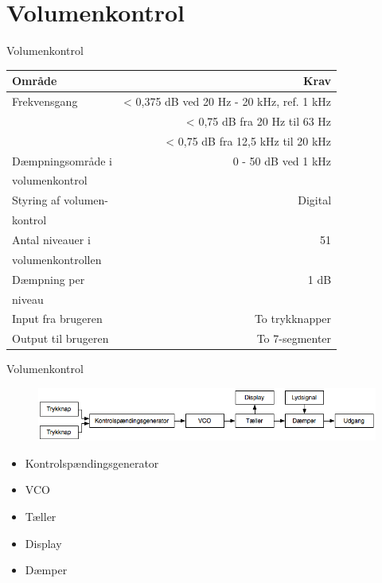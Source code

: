 \section{Volumenkontrol}

\begin{frame}{Volumenkontrol}
\scriptsize{
\begin{table}[h]
\centering
\begin{tabular}{l|r}
\hline\hline
Område & Krav \\
\hline\hline
Frekvensgang & < 0,375 dB ved 20 Hz - 20 kHz, ref. 1 kHz \\
& < 0,75 dB fra 20 Hz til 63 Hz \\
& < 0,75 dB fra 12,5 kHz til 20 kHz \\[4pt]
Dæmpningsområde i & 0 - 50 dB ved 1 kHz \\
volumenkontrol & \\[4pt]
Styring af volumen- & Digital \\
kontrol & \\[4pt]
Antal niveauer i & 51 \\
volumenkontrollen & \\[4pt]
Dæmpning per & 1 dB \\
niveau & \\[4pt]
Input fra brugeren & To trykknapper \\[4pt]
Output til brugeren & To 7-segmenter \\
\hline\hline
\end{tabular}
\end{table}}
\end{frame}

\begin{frame}{Volumenkontrol}
\begin{figure}[h]
\centering
\includegraphics[scale=0.4]{images/blokdiagram-volumenkontrol.png}
\end{figure}

\begin{itemize}
\item<2-> Kontrolspændingsgenerator
\item<3-> VCO
\item<4-> Tæller
\item<5-> Display
\item<6-> Dæmper
\end{itemize}
\end{frame}